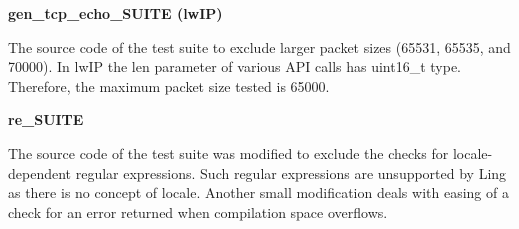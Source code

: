 \documentclass{article}
\begin{document}
\textbf{gen\_tcp\_echo\_SUITE (lwIP)}

The source code of the test suite to exclude larger packet sizes (65531, 65535,
and 70000). In lwIP the len parameter of various API calls has uint16\_t type.
Therefore, the maximum packet size tested is 65000.

\textbf{re\_SUITE}

The source code of the test suite was modified to exclude the checks for
locale-dependent regular expressions. Such regular expressions are unsupported
by Ling as there is no concept of locale. Another small modification deals with
easing of a check for an error returned when compilation space overflows.
\end{document}
